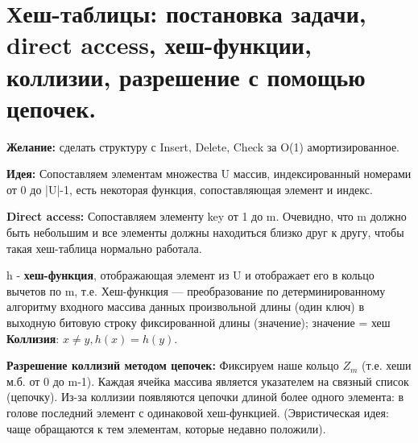 \setcounter{section}{75}
\section{Хеш-таблицы: постановка задачи, direct access, хеш-функции, коллизии, разрешение с помощью цепочек.}
\textbf{Желание:} сделать структуру с Insert, Delete, Check за O(1) амортизированное. \par
\textbf{Идея:} Сопоставляем элементам множества U массив, индексированный номерами от 0 до |U|-1, есть некоторая функция, сопоставляющая элемент и индекс. \par
\textbf{Direct access: } Сопоставляем элементу key от 1 до m. Очевидно, что m должно быть небольшим и все элементы должны находиться близко друг к другу, чтобы такая хеш-таблица нормально работала. \par
h - \textbf{хеш-функция}, отображающая элемент из U и отображает его в кольцо вычетов по m, т.е. Хеш-функция — преобразование по детерминированному алгоритму входного массива данных произвольной длины (один ключ) в выходную битовую строку фиксированной длины (значение); значение = хеш \textbf{Коллизия}: $x \neq y, h(x) = h(y)$. \par
\textbf{Разрешение коллизий методом цепочек:} Фиксируем наше кольцо $Z_m$ (т.е. хеши м.б. от 0 до m-1). Каждая ячейка массива является указателем на связный список (цепочку). Из-за коллизии появляются цепочки длиной более одного элемента: в голове последний элемент с одинаковой хеш-функцией. (Эвристическая идея: чаще обращаются к тем элементам, которые недавно положили).
\setcounter{section}{76}
